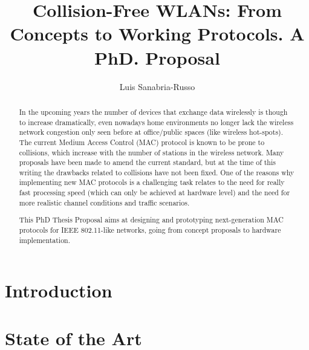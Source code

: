 \documentclass[]{llncs}
\begin{document}
\title{Collision-Free WLANs: From Concepts to Working Protocols. A PhD. Proposal}
\author{Luis Sanabria-Russo}
\maketitle

\begin{abstract}
In the upcoming years the number of devices that exchange data wirelessly is though to increase dramatically, even nowadays home environments no longer lack the wireless network congestion only seen before at office/public spaces (like wireless hot-spots). The current Medium Access Control (MAC) protocol is known to be prone to collisions, which increase with the number of stations in the wireless network. Many proposals have been made to amend the current standard, but at the time of this writing the drawbacks related to collisions have not been fixed. One of the reasons why implementing new MAC protocols is a challenging task relates to the need for really fast processing speed (which can only be achieved at hardware level) and the need for more realistic channel conditions and traffic scenarios.

This PhD Thesis Proposal aims at designing and prototyping next-generation MAC protocols for IEEE 802.11-like networks, going from concept proposals to hardware implementation.



\end{abstract}

\section{Introduction}\label{introduction}
	
\section{State of the Art}\label{stateOfTheArt}
	



\end{document}
